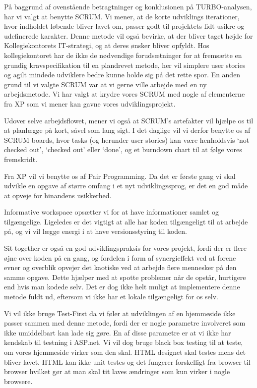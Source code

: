 \documentclass[12pt, a4paper]{report}
\begin{document}
På baggrund af ovenstående betragtninger og konklusionen på TURBO-analysen, har vi valgt at benytte SCRUM. Vi mener, at de korte udviklings iterationer, hvor indholdet løbende bliver lavet om, passer godt til projektets lidt usikre og udefinerede karakter.
Denne metode vil også bevirke, at der bliver taget højde for Kollegiekontorets IT-strategi, og at deres ønsker bliver opfyldt. Hos kollegiekontoret har de ikke de nødvendige forudsætninger for at fremsætte en grundig kravspecifikation til en plandrevet metode, her vil simplere user stories og agilt mindede udviklere bedre kunne holde sig på det rette spor.
En anden grund til vi valgte SCRUM var at vi gerne ville arbejde med en ny arbejdsmetode. Vi har valgt at krydre vores SCRUM med nogle af elementerne fra XP som vi mener kan gavne vores udviklingsprojekt.


Udover selve arbejdsflowet, mener vi også at SCRUM’s artefakter vil hjælpe os til at planlægge på kort, såvel som lang sigt. I det daglige vil vi derfor benytte os af SCRUM boards, hvor tasks (og herunder user stories) kan være henholdsvis ‘not checked out’, ‘checked out’ eller ‘done’, og et burndown chart til at følge vores fremskridt.

Fra XP vil vi benytte os af Pair Programming. Da det er første gang vi skal udvikle en opgave af større omfang i et nyt udviklingssprog, er det en god måde at opveje for hinandens usikkerhed.

Informative workspace opsætter vi for at have informationer samlet og tilgængelige. Ligeledes er det vigtigt at alle har koden tilgængeligt til at arbejde på, og vi vil lægge energi i at have versionsstyring til koden.

Sit together er også en god udviklingspraksis for vores projekt, fordi der er flere øjne over koden på en gang, og fordelen i form af synergieffekt ved at forene evner og overblik opvejer det kaotiske ved at arbejde flere mennesker på den samme opgave. Dette hjælper med at spotte problemer når de opstår, hurtigere end hvis man kodede selv. Det er dog ikke helt muligt at implementere denne metode fuldt ud, eftersom vi ikke har et lokale tilgængeligt for os selv.

Vi vil ikke bruge Test-First da vi føler at udviklingen af en hjemmeside ikke passer sammen med denne metode, fordi der er nogle parametre involveret som ikke umiddelbart kan lade sig gøre. En af disse parametre er at vi ikke har kendskab til testning i ASP.net.
Vi vil dog bruge black box testing til at teste, om vores hjemmeside virker som den skal.
HTML designet skal testes mens det bliver lavet. HTML kan ikke unit testes og det fungerer forskelligt fra browser til browser hvilket gør at man skal tit laves ændringer som kun virker i nogle browsere.
\end{document}
